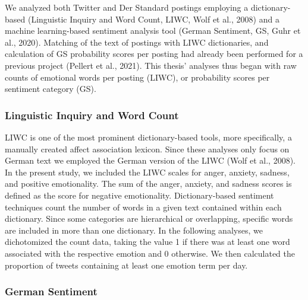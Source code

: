 \documentclass[
  english,
  jou,floatsintext]{apa7}
\begin{document}
We analyzed both Twitter and Der Standard postings employing a dictionary-based (Linguistic Inquiry and Word Count, LIWC, Wolf et al., 2008) and a machine learning-based sentiment analysis tool (German Sentiment, GS, Guhr et al., 2020). Matching of the text of postings with LIWC dictionaries, and calculation of GS probability scores per posting had already been performed for a previous project (Pellert et al., 2021). This thesis' analyses thus began with raw counts of emotional words per posting (LIWC), or probability scores per sentiment category (GS).

\hypertarget{linguistic-inquiry-and-word-count}{%
\subsubsection{Linguistic Inquiry and Word Count}\label{linguistic-inquiry-and-word-count}}

LIWC is one of the most prominent dictionary-based tools, more specifically, a manually created affect association lexicon. Since these analyses only focus on German text we employed the German version of the LIWC (Wolf et al., 2008). In the present study, we included the LIWC scales for anger, anxiety, sadness, and positive emotionality. The sum of the anger, anxiety, and sadness scores is defined as the score for negative emotionality. Dictionary-based sentiment techniques count the number of words in a given text contained within each dictionary. Since some categories are hierarchical or overlapping, specific words are included in more than one dictionary.
In the following analyses, we dichotomized the count data, taking the value 1 if there was at least one word associated with the respective emotion and 0 otherwise. We then calculated the proportion of tweets containing at least one emotion term per day.

\hypertarget{german-sentiment}{%
\subsubsection{German Sentiment}\label{german-sentiment}}
\end{document}
